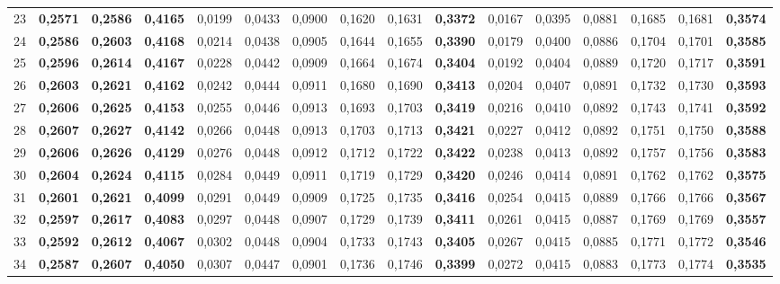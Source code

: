 \begin{table}[htp!]
\begin{adjustwidth}{-2cm}{}
\begin{tabular}{ l | *{15}{| r}}
23	&	\textbf{0,2571}	&	\textbf{0,2586}	&	\textbf{0,4165}	&	0,0199	&	0,0433	&	0,0900	&	0,1620	&	0,1631	&	\textbf{0,3372}	&	0,0167	&	0,0395	&	0,0881	&	0,1685	&	0,1681	&	\textbf{0,3574}	\\
24	&	\textbf{0,2586}	&	\textbf{0,2603}	&	\textbf{0,4168}	&	0,0214	&	0,0438	&	0,0905	&	0,1644	&	0,1655	&	\textbf{0,3390}	&	0,0179	&	0,0400	&	0,0886	&	0,1704	&	0,1701	&	\textbf{0,3585}	\\
25	&	\textbf{0,2596}	&	\textbf{0,2614}	&	\textbf{0,4167}	&	0,0228	&	0,0442	&	0,0909	&	0,1664	&	0,1674	&	\textbf{0,3404}	&	0,0192	&	0,0404	&	0,0889	&	0,1720	&	0,1717	&	\textbf{0,3591}	\\
26	&	\textbf{0,2603}	&	\textbf{0,2621}	&	\textbf{0,4162}	&	0,0242	&	0,0444	&	0,0911	&	0,1680	&	0,1690	&	\textbf{0,3413}	&	0,0204	&	0,0407	&	0,0891	&	0,1732	&	0,1730	&	\textbf{0,3593}	\\
27	&	\textbf{0,2606}	&	\textbf{0,2625}	&	\textbf{0,4153}	&	0,0255	&	0,0446	&	0,0913	&	0,1693	&	0,1703	&	\textbf{0,3419}	&	0,0216	&	0,0410	&	0,0892	&	0,1743	&	0,1741	&	\textbf{0,3592}	\\
28	&	\textbf{0,2607}	&	\textbf{0,2627}	&	\textbf{0,4142}	&	0,0266	&	0,0448	&	0,0913	&	0,1703	&	0,1713	&	\textbf{0,3421}	&	0,0227	&	0,0412	&	0,0892	&	0,1751	&	0,1750	&	\textbf{0,3588}	\\
29	&	\textbf{0,2606}	&	\textbf{0,2626}	&	\textbf{0,4129}	&	0,0276	&	0,0448	&	0,0912	&	0,1712	&	0,1722	&	\textbf{0,3422}	&	0,0238	&	0,0413	&	0,0892	&	0,1757	&	0,1756	&	\textbf{0,3583}	\\
30	&	\textbf{0,2604}	&	\textbf{0,2624}	&	\textbf{0,4115}	&	0,0284	&	0,0449	&	0,0911	&	0,1719	&	0,1729	&	\textbf{0,3420}	&	0,0246	&	0,0414	&	0,0891	&	0,1762	&	0,1762	&	\textbf{0,3575}	\\
31	&	\textbf{0,2601}	&	\textbf{0,2621}	&	\textbf{0,4099}	&	0,0291	&	0,0449	&	0,0909	&	0,1725	&	0,1735	&	\textbf{0,3416}	&	0,0254	&	0,0415	&	0,0889	&	0,1766	&	0,1766	&	\textbf{0,3567}	\\
32	&	\textbf{0,2597}	&	\textbf{0,2617}	&	\textbf{0,4083}	&	0,0297	&	0,0448	&	0,0907	&	0,1729	&	0,1739	&	\textbf{0,3411}	&	0,0261	&	0,0415	&	0,0887	&	0,1769	&	0,1769	&	\textbf{0,3557}	\\
33	&	\textbf{0,2592}	&	\textbf{0,2612}	&	\textbf{0,4067}	&	0,0302	&	0,0448	&	0,0904	&	0,1733	&	0,1743	&	\textbf{0,3405}	&	0,0267	&	0,0415	&	0,0885	&	0,1771	&	0,1772	&	\textbf{0,3546}	\\
34	&	\textbf{0,2587}	&	\textbf{0,2607}	&	\textbf{0,4050}	&	0,0307	&	0,0447	&	0,0901	&	0,1736	&	0,1746	&	\textbf{0,3399}	&	0,0272	&	0,0415	&	0,0883	&	0,1773	&	0,1774	&	\textbf{0,3535}	\\

\end{tabular}
\end{adjustwidth}
\end{table}

